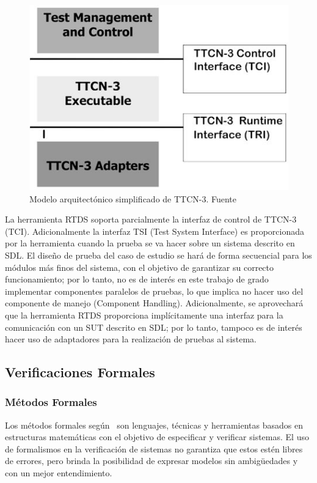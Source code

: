 \begin{figure}[!h]
  \centering
  \includegraphics[scale=0.5]{./images/ModeloTTCN3.jpg}
  \caption{Modelo arquitect\'onico simplificado de TTCN-3. Fuente~\cite{Andrus} }
  \label{fig:modeloTTCN3}
\end{figure}

La herramienta RTDS soporta parcialmente la interfaz de control de TTCN-3 (TCI). 
Adicionalmente la interfaz TSI (Test System Interface) es proporcionada por la 
herramienta cuando la prueba se va hacer sobre un sistema descrito en SDL. El 
dise\~no de prueba del caso de estudio se har\'a de forma secuencial para los 
m\'odulos m\'as finos del sistema, con el objetivo de garantizar su correcto 
funcionamiento; por lo tanto, no es de inter\'es en este trabajo de grado 
implementar componentes paralelos de pruebas, lo que implica no hacer uso del 
componente de manejo (Component Handling). Adicionalmente, se aprovechar\'a que 
la herramienta RTDS proporciona impl\'icitamente una interfaz para la 
comunicaci\'on con un SUT descrito en SDL; por lo tanto, tampoco es de inter\'es 
hacer uso de adaptadores para la realizaci\'on de pruebas al sistema.


\subsection{Verificaciones Formales}

\subsubsection{M\'etodos Formales}

Los m\'etodos formales seg\'un~\cite{Clarke1996} son lenguajes, t\'ecnicas y 
herramientas basados en estructuras matem\'aticas con el objetivo de especificar 
y verificar sistemas. El uso de formalismos en la verificaci\'on de sistemas no 
garantiza que estos est\'en libres de errores, pero brinda la posibilidad de 
expresar modelos sin ambig\"uedades y con un mejor entendimiento.

